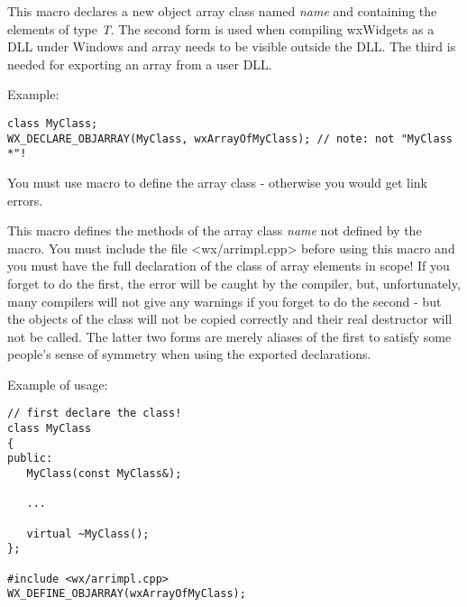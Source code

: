 \label{wxdeclareobjarray}




This macro declares a new object array class named {\it name} and containing
the elements of type {\it T}. The second form is used when compiling wxWidgets as
a DLL under Windows and array needs to be visible outside the DLL.  The third is
needed for exporting an array from a user DLL.

Example:

\begin{verbatim}
class MyClass;
WX_DECLARE_OBJARRAY(MyClass, wxArrayOfMyClass); // note: not "MyClass *"!
\end{verbatim}

You must use  macro to define
the array class - otherwise you would get link errors.

\label{wxdefineobjarray}




This macro defines the methods of the array class {\it name} not defined by the 
 macro. You must include the
file <wx/arrimpl.cpp> before using this macro and you must have the full
declaration of the class of array elements in scope! If you forget to do the 
first, the error will be caught by the compiler, but, unfortunately, many
compilers will not give any warnings if you forget to do the second - but the
objects of the class will not be copied correctly and their real destructor will
not be called.  The latter two forms are merely aliases of the first to satisfy
some people's sense of symmetry when using the exported declarations.

Example of usage:

\begin{verbatim}
// first declare the class!
class MyClass
{
public:
   MyClass(const MyClass&);

   ...

   virtual ~MyClass();
};

#include <wx/arrimpl.cpp>
WX_DEFINE_OBJARRAY(wxArrayOfMyClass);
\end{verbatim}

